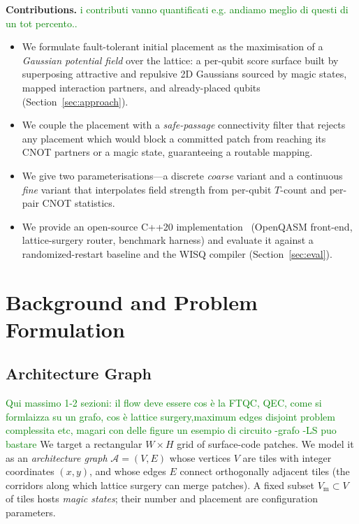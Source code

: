 \documentclass[10pt,conference]{IEEEtran}
\theoremstyle{definition}
\theoremstyle{remark}
\newcommand{\A}{\mathcal{A}}            %
\begin{document}
\smallskip
\noindent\textbf{Contributions.}
\textcolor{green}{i contributi vanno quantificati e.g. andiamo meglio di questi di un tot percento..}
\begin{itemize}
    \item We formulate fault-tolerant initial placement as the maximisation of
    a \emph{Gaussian potential field} over the lattice: a per-qubit score
    surface built by superposing attractive and repulsive 2D Gaussians sourced
    by magic states, mapped interaction partners, and already-placed qubits
    (Section~\ref{sec:approach}).
    \item We couple the placement with a \emph{safe-passage} connectivity
    filter that rejects any placement which would block a committed patch from
    reaching its CNOT partners or a magic state, guaranteeing a routable mapping.
    \item We give two parameterisations---a discrete \emph{coarse} variant and a
    continuous \emph{fine} variant that interpolates field strength from
    per-qubit $T$-count and per-pair CNOT statistics.
    \item We provide an open-source C++20 implementation~\cite{ftqc} (OpenQASM
    front-end, lattice-surgery router, benchmark harness) and evaluate it
    against a randomized-restart baseline and the WISQ compiler
    (Section~\ref{sec:eval}).
\end{itemize}

\section{Background and Problem Formulation}
\label{sec:background}

\subsection{Architecture Graph}
\textcolor{green}{Qui massimo 1-2 sezioni: il flow deve essere cos è la FTQC, QEC, come si formlaizza su un grafo,  cos è lattice surgery,maximum edges disjoint problem complessita etc, magari con delle figure un esempio di circuito -grafo -LS puo bastare }
We target a rectangular $W\times H$ grid of surface-code patches. We model it as
an \emph{architecture graph} $\A = (V, E)$ whose vertices $V$ are tiles
with integer coordinates $(x,y)$, and whose edges $E$ connect orthogonally
adjacent tiles (the corridors along which lattice surgery can merge patches). A
fixed subset $V_{\mathrm{m}} \subset V$ of tiles hosts \emph{magic states};
their number and placement are configuration parameters.
\end{document}

